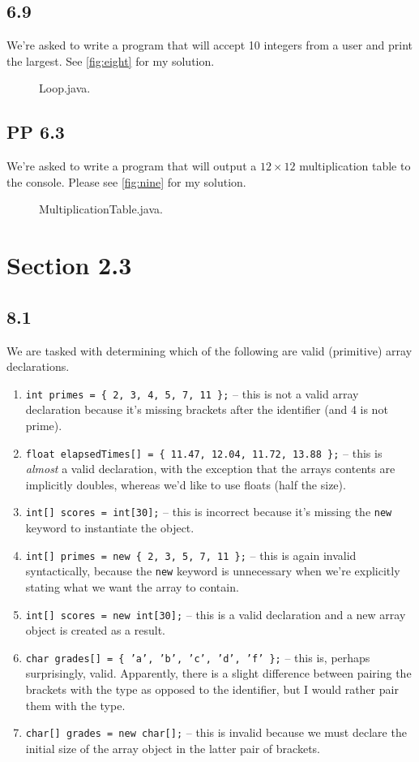 \documentclass[leqno, 11pt]{article}
\begin{document}
\subsection*{6.9}
We're asked to write a program that will accept 10 integers from a user and print the largest. See \autoref{fig:eight} for my solution.
\begin{figure}[h!]
  \centering
  
  \caption{Loop.java.}
  \label{fig:eight}
\end{figure}
\subsection*{PP 6.3}
We're asked to write a program that will output a $12\times 12$ multiplication table to the console. Please see \autoref{fig:nine} for my solution.
\begin{figure}[h!]
  \centering
  
  \caption{MultiplicationTable.java.}
  \label{fig:nine}
\end{figure}
\section*{Section 2.3}
\subsection*{8.1}
We are tasked with determining which of the following are valid (primitive) array declarations.
\begin{enumerate}[label=\alph*.]
  \itemsep-0.3em
  \item \texttt{int primes = \{ 2, 3, 4, 5, 7, 11 \};} -- this is not a valid array declaration because it's missing brackets after the identifier (and 4 is not prime).
  \item \texttt{float elapsedTimes[] = \{ 11.47, 12.04, 11.72, 13.88 \};} -- this is \textit{almost} a valid declaration, with the exception that the arrays contents are implicitly doubles, whereas we'd like to use floats (half the size).
  \item \texttt{int[] scores = int[30];} -- this is incorrect because it's missing the \texttt{new} keyword to instantiate the object.
  \item \texttt{int[] primes = new \{ 2, 3, 5, 7, 11 \};} -- this is again invalid syntactically, because the \texttt{new} keyword is unnecessary when we're explicitly stating what we want the array to contain.
  \item \texttt{int[] scores = new int[30];} -- this is a valid declaration and a new array object is created as a result.
  \item \texttt{char grades[] = \{ 'a', 'b', 'c', 'd', 'f' \};} -- this is, perhaps surprisingly, valid. Apparently, there is a slight difference between pairing the brackets with the type as opposed to the identifier, but I would rather pair them with the type.
  \item \texttt{char[] grades = new char[];} -- this is invalid because we must declare the initial size of the array object in the latter pair of brackets.
\end{enumerate}
\end{document}
